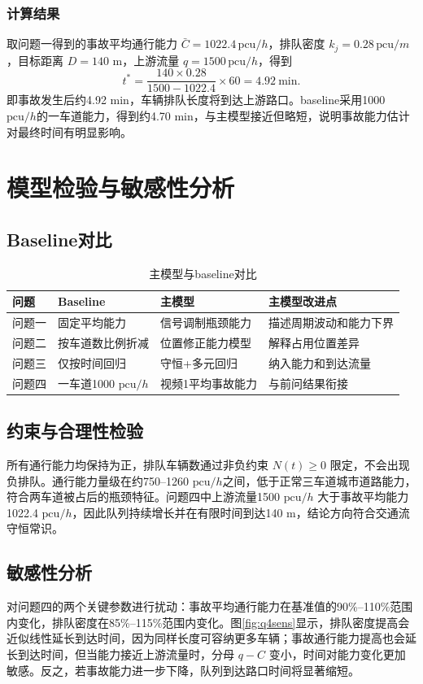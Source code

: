 \documentclass[UTF8,a4paper,12pt]{ctexart}
\newcommand{\pcu}{\mathrm{pcu}}
\begin{document}
\subsubsection{计算结果}
取问题一得到的事故平均通行能力 $\bar C=1022.4\,\pcu/h$，排队密度 $k_j=0.28\,\pcu/m$，目标距离 $D=140$ m，上游流量 $q=1500\,\pcu/h$，得到
\begin{equation}
t^*=\frac{140\times 0.28}{1500-1022.4}\times 60=4.92\ \mathrm{min}.
\end{equation}
即事故发生后约4.92 min，车辆排队长度将到达上游路口。baseline采用1000 $\pcu/h$的一车道能力，得到约4.70 min，与主模型接近但略短，说明事故能力估计对最终时间有明显影响。

\section{模型检验与敏感性分析}
\subsection{Baseline对比}
\begin{table}[H]
\centering
\caption{主模型与baseline对比}
\begin{tabular}{llll}
\toprule
问题 & Baseline & 主模型 & 主模型改进点\\
\midrule
问题一 & 固定平均能力 & 信号调制瓶颈能力 & 描述周期波动和能力下界\\
问题二 & 按车道数比例折减 & 位置修正能力模型 & 解释占用位置差异\\
问题三 & 仅按时间回归 & 守恒+多元回归 & 纳入能力和到达流量\\
问题四 & 一车道1000 $\pcu/h$ & 视频1平均事故能力 & 与前问结果衔接\\
\bottomrule
\end{tabular}
\end{table}

\subsection{约束与合理性检验}
所有通行能力均保持为正，排队车辆数通过非负约束 $N(t)\geq0$ 限定，不会出现负排队。通行能力量级在约750--1260 $\pcu/h$之间，低于正常三车道城市道路能力，符合两车道被占后的瓶颈特征。问题四中上游流量1500 $\pcu/h$ 大于事故平均能力1022.4 $\pcu/h$，因此队列持续增长并在有限时间到达140 m，结论方向符合交通流守恒常识。

\subsection{敏感性分析}
对问题四的两个关键参数进行扰动：事故平均通行能力在基准值的90\%--110\%范围内变化，排队密度在85\%--115\%范围内变化。图\ref{fig:q4sens}显示，排队密度提高会近似线性延长到达时间，因为同样长度可容纳更多车辆；事故通行能力提高也会延长到达时间，但当能力接近上游流量时，分母 $q-C$ 变小，时间对能力变化更加敏感。反之，若事故能力进一步下降，队列到达路口时间将显著缩短。
\end{document}
